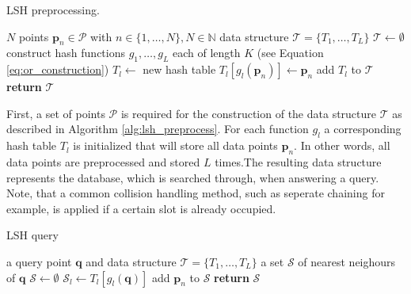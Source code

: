 \documentclass[../../../main.tex]{subfiles}
\begin{document}
\begin{algorithm}
    \caption[LSH preprocessing]{LSH preprocessing.}
    \label{alg:lsh_preprocess}
    \begin{algorithmic}[1]
        \REQUIRE $N$ points $\bm{p}_n \in \mathcal{P}$ with $n \in \{1, \dots, N\}, N \in \mathbb{N}$
        \ENSURE data structure $\mathcal{T} = \{T_1, \dots, T_L\}$
        \STATE $\mathcal{T} \leftarrow \emptyset$
        \STATE construct hash functions $g_1, \dots, g_L$ each of length $K$ (see Equation \ref{eq:or_construction})
            \STATE $T_l \leftarrow$ new hash table
                \STATE $T_l[g_l(\bm{p}_n)] \leftarrow \bm{p}_n$
            \ENDFOR
            \STATE add $T_l$ to $\mathcal{T}$
        \ENDFOR
        \STATE \textbf{return} $\mathcal{T}$
    \end{algorithmic}
 \end{algorithm}

 First, a set of points $\mathcal{P}$ is required for the construction of the data structure $\mathcal{T}$ as described in Algorithm \ref{alg:lsh_preprocess}. For each function $g_l$ a corresponding hash table $T_l$ is initialized that will store all data points $\bm{p}_n$.  In other words, all data points are preprocessed and stored $L$ times.The resulting data structure represents the database, which is searched through, when answering a query. Note, that a common collision handling method, such as seperate chaining for example, is applied if a certain slot is already occupied.

 \begin{algorithm}
    \caption[LSH query]{LSH query}
    \label{alg:lsh_query}
    \begin{algorithmic}[1]
        \REQUIRE a query point $\bm{q}$ and data structure $\mathcal{T} = \{T_1, \dots, T_L\}$
        \ENSURE a set $\mathcal{S}$ of nearest neighours of $\bm{q}$
        \STATE $\mathcal{S} \leftarrow \emptyset$
            \STATE $\mathcal{S}_l \leftarrow T_l[g_l(\bm{q})]$
                        \STATE add $\bm{p}_n$ to $\mathcal{S}$
                    \ENDIF
                \ENDFOR
            \ENDIF
        \ENDFOR
        \STATE \textbf{return} $\mathcal{S}$
    \end{algorithmic}
 \end{algorithm}
\end{document}
